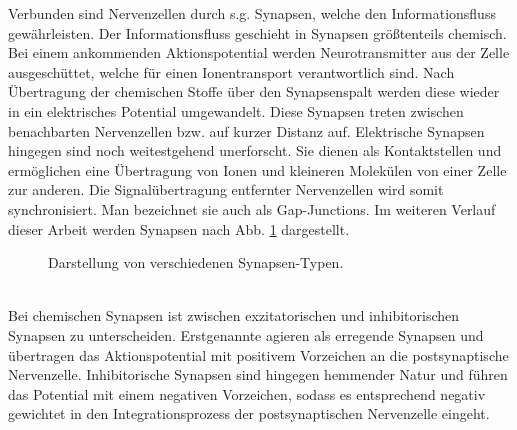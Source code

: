 	Verbunden sind Nervenzellen durch s.g. Synapsen, welche den Informationsfluss gewährleisten. Der Informationsfluss geschieht in Synapsen größtenteils chemisch. Bei einem ankommenden Aktionspotential werden Neurotransmitter aus der Zelle ausgeschüttet, welche für einen Ionentransport verantwortlich sind. Nach Übertragung der chemischen Stoffe über den Synapsenspalt werden diese wieder in ein elektrisches Potential umgewandelt. Diese Synapsen treten zwischen benachbarten Nervenzellen bzw. auf kurzer Distanz auf. Elektrische Synapsen hingegen sind noch weitestgehend unerforscht. Sie dienen als Kontaktstellen und ermöglichen eine Übertragung von Ionen und kleineren Molekülen von einer Zelle zur anderen. Die Signalübertragung entfernter Nervenzellen wird somit synchronisiert. Man bezeichnet sie auch als \glqq Gap-Junctions\grqq. Im weiteren Verlauf dieser Arbeit werden Synapsen nach Abb. \ref{fig:synapse} dargestellt.\\
	\begin{figure}[!h] %
		\centering
		\def\svgwidth{12cm}
		
		\caption{Darstellung von verschiedenen Synapsen-Typen.}
		\label{fig:synapse}
	\end{figure}\\
	Bei chemischen Synapsen ist zwischen exzitatorischen und inhibitorischen Synapsen zu unterscheiden. Erstgenannte agieren als erregende Synapsen und übertragen das Aktionspotential mit positivem Vorzeichen an die postsynaptische Nervenzelle. Inhibitorische Synapsen sind hingegen hemmender Natur und führen das Potential mit einem negativen Vorzeichen, sodass es entsprechend negativ gewichtet in den Integrationsprozess der postsynaptischen Nervenzelle eingeht.
